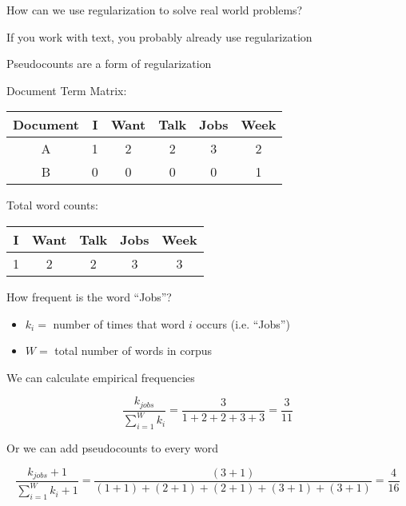 \documentclass[xcolor=pdftex,dvipsnames,table]{beamer}
\begin{document}
\frame
{
	How can we use regularization to solve real world problems?
}

\frame
{
	If you work with text, you probably already use regularization
}

\frame
{
	Pseudocounts are a form of regularization
}

\frame
{
	Document Term Matrix:
	\begin{table}[htdp]
	\begin{center}
	\begin{tabular}{|c|c|c|c|c|c|}
	\hline
	Document & I & Want & Talk & Jobs & Week \\
	\hline
	A & 1 & 2 & 2 & 3 & 2 \\
	B & 0 & 0 & 0 & 0 & 1 \\
	\hline
	\end{tabular}
	\end{center}
	\end{table}
}

\frame
{
	Total word counts:
	\begin{table}[htdp]
	\begin{center}
	\begin{tabular}{|c|c|c|c|c|}
	\hline
	I & Want & Talk & Jobs & Week \\
	\hline
	1 & 2 & 2 & 3 & 3 \\
	\hline
	\end{tabular}
	\end{center}
	\end{table}
}

\frame
{
	How frequent is the word ``Jobs''?
}

\frame
{
	\begin{itemize}
		\item{$k_{i} = $ number of times that word $i$ occurs (i.e. ``Jobs'')}
		\item{$W = $ total number of words in corpus}
	\end{itemize}
}

\frame
{
	We can calculate empirical frequencies
}

\frame
{
	\[
		\frac{k_{jobs}}{\sum_{i  = 1}^{W} k_{i}} = \frac{3}{1 + 2 + 2 + 3 + 3} = \frac{3}{11}
	\]
}

\frame
{
	Or we can add pseudocounts to every word
}

\frame
{
	\[
		\frac{k_{jobs} + 1}{\sum_{i  = 1}^{W} k_{i} + 1} = \frac{(3 + 1)}{(1 + 1) + (2 + 1) + (2 + 1) + (3 + 1) + (3 + 1)} = \frac{4}{16}
	\]
}
\end{document}
